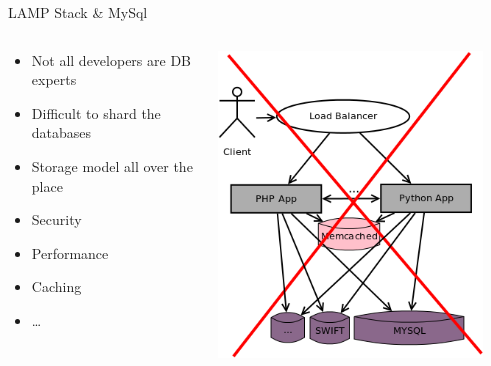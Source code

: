 \documentclass[aspectratio=43]{beamer}
\begin{document}
\begin{frame}{LAMP Stack \& MySql}
    \begin{columns}
        \begin{column}[c]{0.5\textwidth}
            \begin{itemize}
                \item Not all developers are DB experts
                \item Difficult to shard the databases
                \item Storage model all over the place
                \item Security
                \item Performance
                \item Caching
                \item \dots
            \end{itemize}
        \end{column}
        \begin{column}[c]{0.5\textwidth}
            \includegraphics[width=0.9\textwidth]{images/oldstorageusage.png}
        \end{column}
    \end{columns}
\end{frame}
\end{document}

